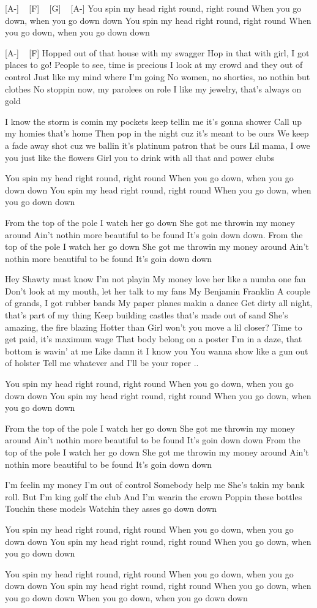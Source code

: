 [A-] ~ [F] ~ [G] ~ [A-]
You spin my head right round, right round
When you go down, when you go down down
You spin my head right round, right round
When you go down, when you go down down

[A-] ~ [F]
Hopped out of that house with my swagger
Hop in that with girl, I got places to go!
People to see, time is precious
I look at my crowd and they out of control
Just like my mind where I’m going
No women, no shorties, no nothin but clothes
No stoppin now, my parolees on role
I like my jewelry, that’s always on gold

I know the storm is comin
my pockets keep tellin me it’s gonna shower
Call up my homies that’s home
Then pop in the night cuz it’s meant to be ours
We keep a fade away shot cuz we ballin
it’s platinum patron that be ours
Lil mama, I owe you just like the flowers
Girl you to drink with all that and power clubs

You spin my head right round, right round
When you go down, when you go down down
You spin my head right round, right round
When you go down, when you go down down

From the top of the pole I watch her go down
She got me throwin my money around
Ain’t nothin more beautiful to be found
It’s goin down down.
From the top of the pole I watch her go down
She got me throwin my money around
Ain’t nothin more beautiful to be found
It’s goin down down

Hey
Shawty must know I’m not playin
My money love her like a numba one fan
Don’t look at my mouth, let her talk to my fans
My Benjamin Franklin
A couple of grands, I got rubber bands
My paper planes makin a dance
Get dirty all night, that’s part of my thing
Keep building castles that’s made out of sand
She’s amazing, the fire blazing
Hotter than
Girl won’t you move a lil closer?
Time to get paid, it’s maximum wage
That body belong on a poster
I’m in a daze, that bottom is wavin’ at me
Like damn it I know you
You wanna show like a gun out of holster
Tell me whatever and I’ll be your roper ..

You spin my head right round, right round
When you go down, when you go down down
You spin my head right round, right round
When you go down, when you go down down

From the top of the pole I watch her go down
She got me throwin my money around
Ain’t nothin more beautiful to be found
It’s goin down down
From the top of the pole I watch her go down
She got me throwin my money around
Ain’t nothin more beautiful to be found
It’s goin down down

I’m feelin my money
I’m out of control
Somebody help me
She’s takin my bank roll.
But I’m king golf the club
And I’m wearin the crown
Poppin these bottles
Touchin these models
Watchin they asses go down down

You spin my head right round, right round
When you go down, when you go down down
You spin my head right round, right round
When you go down, when you go down down

You spin my head right round, right round
When you go down, when you go down down
You spin my head right round, right round
When you go down, when you go down down
When you go down, when you go down down

